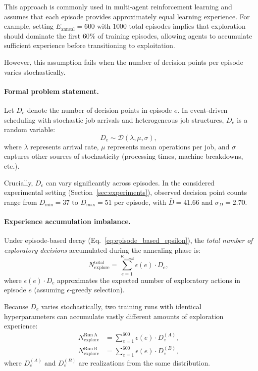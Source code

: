 This approach is commonly used in multi-agent reinforcement learning and assumes
that each episode provides approximately equal learning experience. For example,
setting $E_{\mathrm{anneal}} = 600$ with $1000$ total episodes implies that
exploration should dominate the first $60\%$ of training episodes, allowing
agents to accumulate sufficient experience before transitioning to exploitation.

However, this assumption fails when the number of decision points per episode
varies stochastically.

\paragraph{Formal problem statement.}
Let $D_e$ denote the number of decision points in episode $e$. In event-driven
scheduling with stochastic job arrivals and heterogeneous job structures,
$D_e$ is a random variable:
\begin{equation}
D_e \sim \mathcal{D}(\lambda, \mu, \sigma),
\label{eq:decision_points_distribution}
\end{equation}
where $\lambda$ represents arrival rate, $\mu$ represents mean operations per job,
and $\sigma$ captures other sources of stochasticity (processing times, machine
breakdowns, etc.).

Crucially, $D_e$ can vary significantly across episodes. In the considered
experimental setting (Section~\ref{sec:experiments}), observed decision point
counts range from $D_{\min}=37$ to $D_{\max}=51$ per episode, with
$\bar{D}=41.66$ and $\sigma_D=2.70$.

\paragraph{Experience accumulation imbalance.}
Under episode-based decay (Eq.~\ref{eq:episode_based_epsilon}), the \emph{total
number of exploratory decisions} accumulated during the annealing phase is:
\begin{equation}
N_{\mathrm{explore}}^{\mathrm{total}}
=
\sum_{e=1}^{E_{\mathrm{anneal}}} \epsilon(e) \cdot D_e,
\label{eq:total_explore_episode}
\end{equation}
where $\epsilon(e) \cdot D_e$ approximates the expected number of exploratory
actions in episode $e$ (assuming $\epsilon$-greedy selection).

Because $D_e$ varies stochastically, two training runs with identical
hyperparameters can accumulate vastly different amounts of exploration experience:
\begin{align}
N_{\mathrm{explore}}^{\mathrm{Run~A}}
&= \sum_{e=1}^{600} \epsilon(e) \cdot D_e^{(A)},
\label{eq:explore_run_a}
\\
N_{\mathrm{explore}}^{\mathrm{Run~B}}
&= \sum_{e=1}^{600} \epsilon(e) \cdot D_e^{(B)},
\label{eq:explore_run_b}
\end{align}
where $D_e^{(A)}$ and $D_e^{(B)}$ are realizations from the same distribution.

